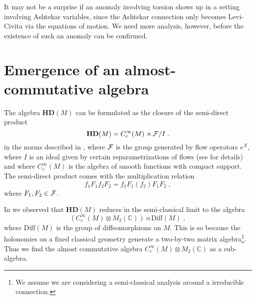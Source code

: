 \documentclass[12pt]{article}
\def\cf{{\cal F}}
\newcommand{\cF}{{\cal F}}
\begin{document}
It may not be a surprise if an anomaly involving torsion shows up in a setting involving Ashtekar variables, since the Ashtekar connection only becomes Levi-Civita via the equations of motion. We need more analysis, however, before the existence of such an anomaly can be confirmed.




















\section{Emergence of an almost-commutative algebra}




The algebra $\mathbf{HD}(M)$ can be formulated as the closure of the semi-direct product
\begin{equation}
\mathbf{HD}(M)  = C_c^\infty(M)  \rtimes  \cF  / I\;.
\label{alg1}
\end{equation}
in the norms described in \cite{AGnew}, where $\cf$ is the group generated by flow operators $e^X$, where $I$ is an ideal given by certain reparametrizations of flows (see \cite{AGnew} for details) and where $C^\infty_c (M) $ is the algebra of smooth functions with compact support. The semi-direct product comes with the multiplication relation
$$f_1F_1 f_2 F_2=f_1 F_1 (f_2) F_1 F_2 \;,  $$
where $F_1,F_2\in\cf$.



In \cite{Aastrup:2012vq} we observed that $\mathbf{HD}(M)$ reduces in the semi-classical limit to the algebra
\begin{equation}
 \left(C_c^\infty(M)\otimes M_2(\mathbb{C})\right) \rtimes \mbox{Diff}(M)\;,
\label{almost}
\end{equation}
where $\mbox{Diff}(M)$ is the group of diffeomorphisms on $M$. This is so because the holonomies on a fixed classical geometry generate a two-by-two matrix algebra\footnote{We assume we are considering a semi-classical analysis around a irreducible connection.}.
Thus we find the almost commutative algebra $C_c^\infty(M)\otimes M_2(\mathbb{C}) $ as a sub-algebra. 
\end{document}
